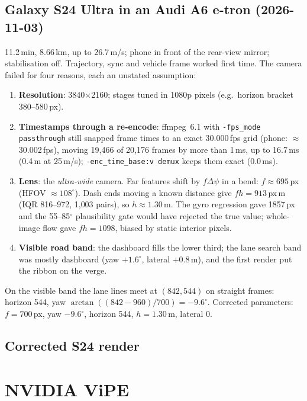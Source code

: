 \documentclass[10pt,a4paper]{article}
\begin{document}
\subsection{Galaxy S24 Ultra in an Audi A6 e-tron (2026-11-03)}
\label{sec:s24}
11.2\,min, 8.66\,km, up to 26.7\,m/s; phone in front of the rear-view mirror; stabilisation off. Trajectory,
sync and vehicle frame worked first time. The camera failed for four reasons, each an unstated assumption:
\begin{enumerate}
\item \textbf{Resolution}: 3840$\times$2160; stages tuned in 1080p pixels (e.g.\ horizon bracket 380--580\,px).
\item \textbf{Timestamps through a re-encode}: ffmpeg~6.1 with \texttt{-fps\_mode passthrough} still snapped frame
  times to an exact 30.000\,fps grid (phone: $\approx$30.002\,fps), moving 19{,}466 of 20{,}176 frames by more than
  1\,ms, up to 16.7\,ms (0.4\,m at 25\,m/s); \texttt{-enc\_time\_base:v demux} keeps them exact (0.0\,ms).
\item \textbf{Lens}: the \emph{ultra-wide} camera. Far features shift by $f\Delta\psi$ in a bend: $f\approx695$\,px
  (HFOV $\approx108^\circ$). Dash ends moving a known distance give $fh = 913$\,px\,m (IQR 816--972, 1{,}003 pairs),
  so $h\approx1.30$\,m. The gyro regression gave 1857\,px and the 55--85$^\circ$ plausibility gate would have
  rejected the true value; whole-image flow gave $fh = 1098$, biased by static interior pixels.
\item \textbf{Visible road band}: the dashboard fills the lower third; the lane search band was mostly dashboard
  (yaw $+1.6^\circ$, lateral $+0.8$\,m), and the first render put the ribbon on the verge.
\end{enumerate}
On the visible band the lane lines meet at $(842, 544)$ on straight frames: horizon 544, yaw
$\arctan((842-960)/700) = -9.6^\circ$. Corrected parameters: $f=700$\,px, yaw $-9.6^\circ$, horizon 544,
$h=1.30$\,m, lateral 0.

\subsection{Corrected S24 render}
\label{sec:s24result}


\section{NVIDIA ViPE}
\label{sec:vipe}
\end{document}
